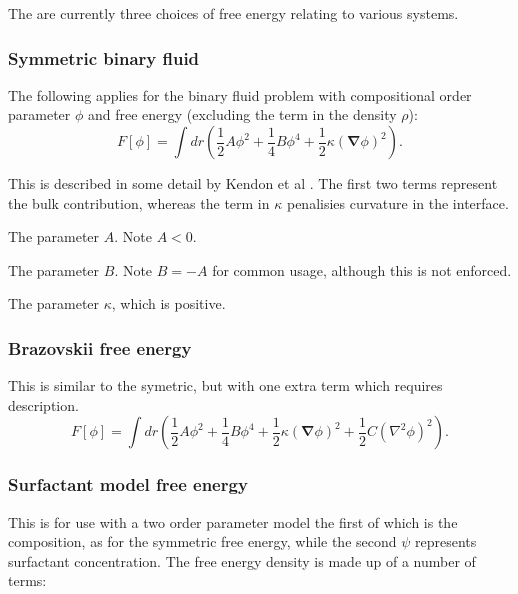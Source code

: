 The are currently three choices of free energy relating to
various systems.

\subsubsection{Symmetric binary fluid}


The following applies for the binary fluid problem with
compositional order parameter $\phi$ and free energy
(excluding the term in the density $\rho$):
\begin{equation}
 F[\phi] = 
\int dr \left(
{\textstyle \frac{1}{2}}A\phi^2
+ {\textstyle \frac{1}{4}}B\phi^4
+ {\textstyle \frac{1}{2}}\kappa (\mathbf{\nabla}\phi)^2 \right).
\end{equation}

This is described in some detail
by Kendon et al \cite{viv}. The first two terms represent the bulk
contribution, whereas the term in $\kappa$ penalisies curvature in
the interface.


The parameter $A$. Note $A < 0$.


The parameter $B$. Note $B = -A$ for common usage, although this is
not enforced.


The parameter $\kappa$, which is positive.


\subsubsection{Brazovskii free energy}

This is similar to the symetric, but with one extra term which
requires description.
\begin{equation}
 F[\phi] = 
\int dr \left(
{\textstyle \frac{1}{2}}A\phi^2
+ {\textstyle \frac{1}{4}}B\phi^4
+ {\textstyle \frac{1}{2}}\kappa (\mathbf{\nabla}\phi)^2
+ {\textstyle \frac{1}{2}} C (\nabla^2 \phi)^2 \right).
\end{equation}

\subsubsection{Surfactant model free energy}


This is for use with a two order parameter model the first of
which is the composition, as for the symmetric free energy,
while the second $\psi$ represents surfactant concentration.
The free energy density is made up of a number of terms:

